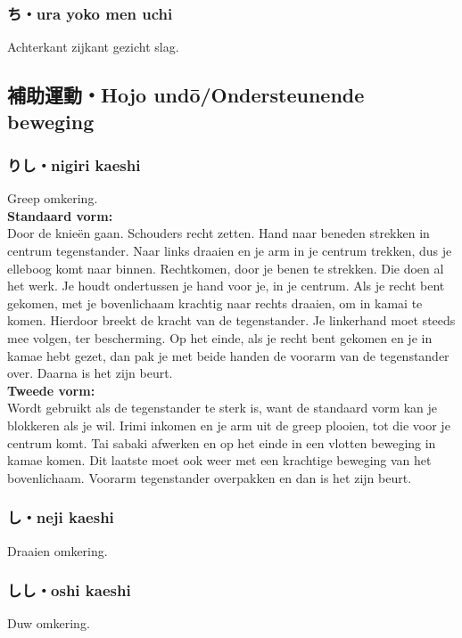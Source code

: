 \subsubsection{ち・ura yoko men uchi}
Achterkant zijkant gezicht slag.

\subsection{補助運動・Hojo und\={o}/Ondersteunende beweging}
\subsubsection{りし・nigiri kaeshi}
Greep omkering.\\
\textbf{Standaard vorm:}\\
Door de knie\"{e}n gaan. Schouders recht zetten. Hand naar beneden strekken in centrum tegenstander. Naar links draaien en je arm in je centrum trekken, dus je elleboog komt naar binnen. Rechtkomen, door je benen te strekken. Die doen al het werk. Je houdt ondertussen je hand voor je, in je centrum. Als je recht bent gekomen, met je bovenlichaam krachtig naar rechts draaien, om in  kamai te komen. Hierdoor breekt de kracht van de tegenstander. Je linkerhand moet steeds mee volgen, ter bescherming. Op het einde, als je recht bent gekomen en je in kamae hebt gezet, dan pak je met beide handen de voorarm van de tegenstander over. Daarna is het zijn beurt.\\
\textbf{Tweede vorm:}\\
Wordt gebruikt als de tegenstander te sterk is, want de standaard vorm kan je blokkeren als je wil. Irimi inkomen en je arm uit de greep plooien, tot die voor je centrum komt. Tai sabaki afwerken en op het einde in een vlotten beweging in kamae komen. Dit laatste moet ook weer met een krachtige beweging van het bovenlichaam. Voorarm tegenstander overpakken en dan is het zijn beurt.

\subsubsection{し・neji kaeshi}
Draaien omkering.

\subsubsection{しし・oshi kaeshi}
Duw omkering.

